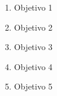 

\lipsum[1][1-5]


\newcommand{\oeOne}{Objetivo 1}
\newcommand{\oeTwo}{Objetivo 2}
\newcommand{\oeThree}{Objetivo 3}
\newcommand{\oeFour}{Objetivo 4}
\newcommand{\oeFive}{Objetivo 5}
\begin{enumerate}
  \item \oeOne
  \item \oeTwo
  \item \oeThree
  \item \oeFour
  \item \oeFive
\end{enumerate}
